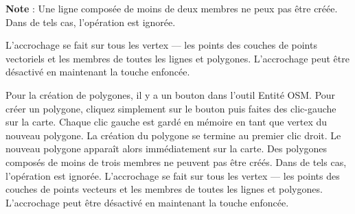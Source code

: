 \textbf{Note} : Une ligne composée de moins de deux membres ne peux pas être créée. Dans de tels cas, l'opération est ignorée.

L'accrochage se fait sur tous les vertex — les points des couches de points vectoriels et les membres de toutes les lignes et polygones. L'accrochage peut être désactivé en maintenant la touche  enfoncée.


Pour la création de polygones, il y a un bouton  dans l'outil Entité OSM. Pour créer un polygone, cliquez simplement sur le bouton puis faites des clic-gauche sur la carte. Chaque clic gauche est gardé en mémoire en tant que vertex du nouveau polygone. La création du polygone se termine au premier clic droit. Le nouveau polygone apparaît alors immédiatement sur la carte. Des polygones composés de moins de trois membres ne peuvent pas être créés. Dans de tels cas, l'opération est ignorée. L'accrochage se fait sur tous les vertex — les points des couches de points vecteurs et les membres de toutes les lignes et polygones. L'accrochage peut être désactivé en maintenant la touche  enfoncée.


